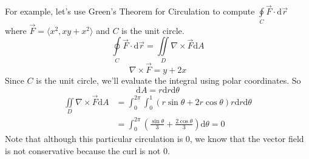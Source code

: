 \noindent
For example, let's use Green's Theorem for Circulation to compute $\oint\limits_{C}{\vec{F} \cdot \mathrm{d}\vec{r}}$ where $\vec{F} = \langle x^2, xy + x^2 \rangle$ and $C$ is the unit circle.
\begin{equation*}
	\oint\limits_{C}{\vec{F} \cdot \mathrm{d}\vec{r}} = \iint\limits_{D}{\nabla \times \vec{F}\mathrm{d}A}	
\end{equation*}
\begin{equation*}
	\nabla \times \vec{F} = y+2x	
\end{equation*}
Since $C$ is the unit circle, we'll evaluate the integral using polar coordinates. So 
\begin{equation*}
	\mathrm{d}A = r\mathrm{d}r\mathrm{d}\theta	
\end{equation*}
\begin{align*}
	\iint\limits_{D}{\nabla \times \vec{F}\mathrm{d}A} &= \int_{0}^{2\pi}{\int_{0}^{1}{(r\sin{\theta} + 2r\cos{\theta})r\mathrm{d}r}\mathrm{d}\theta} \\
	&= \int_{0}^{2\pi}{\left(\frac{\sin{\theta}}{3} + \frac{2\cos{\theta}}{3}\right)\mathrm{d}\theta} = 0
\end{align*}
Note that although this particular circulation is 0, we know that the vector field is not conservative because the curl is not 0.

